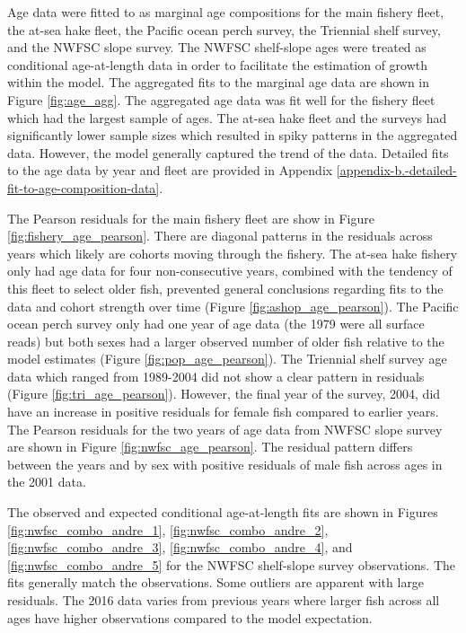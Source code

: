 \documentclass[12pt,]{article}
\begin{document}
Age data were fitted to as marginal age compositions for the main
fishery fleet, the at-sea hake fleet, the Pacific ocean perch survey,
the Triennial shelf survey, and the NWFSC slope survey. The NWFSC
shelf-slope ages were treated as conditional age-at-length data in order
to facilitate the estimation of growth within the model. The aggregated
fits to the marginal age data are shown in Figure \ref{fig:age_agg}. The
aggregated age data was fit well for the fishery fleet which had the
largest sample of ages. The at-sea hake fleet and the surveys had
significantly lower sample sizes which resulted in spiky patterns in the
aggregated data. However, the model generally captured the trend of the
data. Detailed fits to the age data by year and fleet are provided in
Appendix \ref{appendix-b.-detailed-fit-to-age-composition-data}.

The Pearson residuals for the main fishery fleet are show in Figure
\ref{fig:fishery_age_pearson}. There are diagonal patterns in the
residuals across years which likely are cohorts moving through the
fishery. The at-sea hake fishery only had age data for four
non-consecutive years, combined with the tendency of this fleet to
select older fish, prevented general conclusions regarding fits to the
data and cohort strength over time (Figure \ref{fig:ashop_age_pearson}).
The Pacific ocean perch survey only had one year of age data (the 1979
were all surface reads) but both sexes had a larger observed number of
older fish relative to the model estimates (Figure
\ref{fig:pop_age_pearson}). The Triennial shelf survey age data which
ranged from 1989-2004 did not show a clear pattern in residuals (Figure
\ref{fig:tri_age_pearson}). However, the final year of the survey, 2004,
did have an increase in positive residuals for female fish compared to
earlier years. The Pearson residuals for the two years of age data from
NWFSC slope survey are shown in Figure \ref{fig:nwfsc_age_pearson}. The
residual pattern differs between the years and by sex with positive
residuals of male fish across ages in the 2001 data.

The observed and expected conditional age-at-length fits are shown in
Figures \ref{fig:nwfsc_combo_andre_1}, \ref{fig:nwfsc_combo_andre_2},
\ref{fig:nwfsc_combo_andre_3}, \ref{fig:nwfsc_combo_andre_4}, and
\ref{fig:nwfsc_combo_andre_5} for the NWFSC shelf-slope survey
observations. The fits generally match the observations. Some outliers
are apparent with large residuals. The 2016 data varies from previous
years where larger fish across all ages have higher observations
compared to the model expectation.
\end{document}
